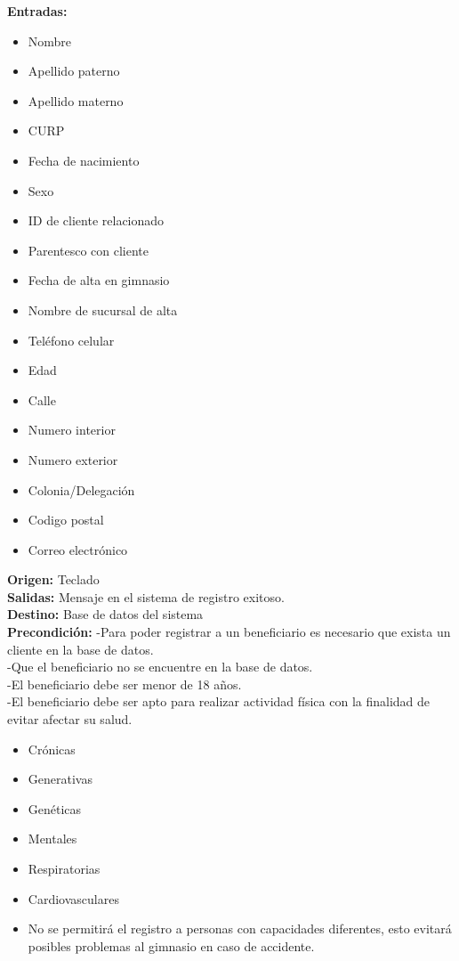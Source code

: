 \textbf{Entradas: }
        \begin{itemize}
         \item Nombre
         \item Apellido paterno
         \item Apellido materno
         \item CURP
         \item Fecha de nacimiento
         \item Sexo
         \item ID de cliente relacionado
         \item Parentesco con cliente
         \item Fecha de alta en gimnasio
         \item Nombre de sucursal de alta 
         \item Teléfono celular
         \item Edad 
         \item Calle 
         \item Numero interior 
         \item Numero exterior 
         \item Colonia/Delegación
         \item Codigo postal
         \item Correo electrónico
\end{itemize}
\textbf{Origen:} Teclado\\
\textbf{Salidas:} Mensaje en el sistema de registro exitoso.\\
\textbf{Destino:} Base de datos del sistema\\
\textbf{Precondición: }
-Para poder registrar a un beneficiario es necesario que exista un cliente en la base de datos.\\ 
-Que el beneficiario no se encuentre en la base de datos.\\
-El beneficiario debe ser menor de 18 años.\\
-El beneficiario debe ser apto para realizar actividad física con la finalidad de evitar  afectar su salud.\\
\begin{itemize}
	\item Crónicas
	\item Generativas
	\item Genéticas
	\item Mentales
	\item Respiratorias
	\item Cardiovasculares
	\item No se permitirá el registro a personas con capacidades diferentes, esto evitará posibles problemas al gimnasio en caso de accidente.
\end{itemize}

